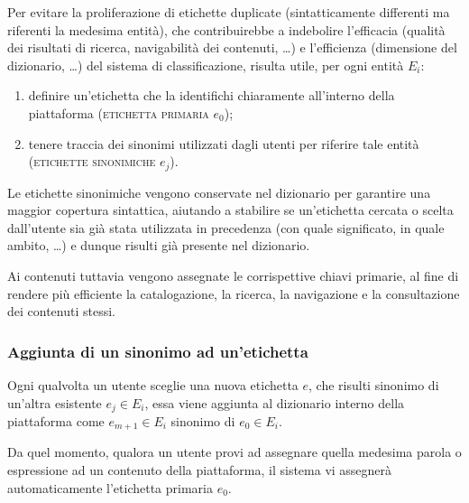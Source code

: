 \documentclass[10pt,a4paper,headinclude,footinclude,hidelinks]{scrreprt} %
\begin{document}
	Per evitare la proliferazione di etichette duplicate (sintatticamente differenti ma riferenti la medesima entità), che contribuirebbe a indebolire l'efficacia (qualità dei risultati di ricerca, navigabilità dei contenuti, \ldots) e l'efficienza (dimensione del dizionario, \ldots) del sistema di classificazione, risulta utile, per ogni entità $E_i$:
	\begin{enumerate}
	\item definire un'etichetta che la identifichi chiaramente all'interno della piattaforma (\textsc{etichetta primaria} $e_0$);
	\item tenere traccia dei sinonimi utilizzati dagli utenti per riferire tale entità (\textsc{etichette sinonimiche} $e_j$).
	\end{enumerate}


	Le etichette sinonimiche vengono conservate nel dizionario per garantire una maggior copertura sintattica, aiutando a stabilire se un'etichetta cercata o scelta dall'utente sia già stata utilizzata in precedenza (con quale significato, in quale ambito, \ldots) e dunque risulti già presente nel dizionario.

	Ai contenuti tuttavia vengono assegnate le corrispettive chiavi primarie, al fine di rendere più efficiente la catalogazione, la ricerca, la navigazione e la consultazione dei contenuti stessi.

	\subsubsection{Aggiunta di un sinonimo ad un'etichetta}
	Ogni qualvolta un utente sceglie una nuova etichetta $e$, che risulti sinonimo di un'altra esistente $e_j \in E_i$, essa viene aggiunta al dizionario interno della piattaforma come $e_{m+1} \in E_i$ sinonimo di $e_0 \in E_i$.

	Da quel momento, qualora un utente provi ad assegnare quella medesima parola o espressione ad un contenuto della piattaforma, il sistema vi 
assegnerà automaticamente l'etichetta primaria $e_0$.

\end{document}
